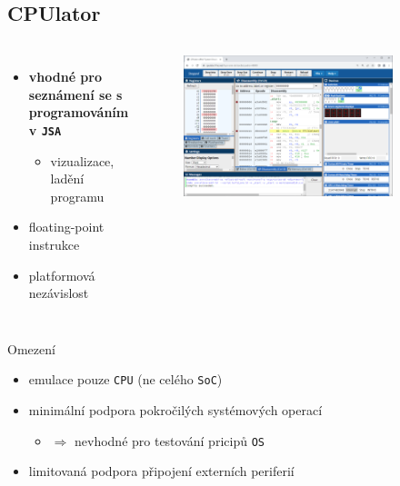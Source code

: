 \documentclass[compress]{beamer}
\begin{document}
\subsection{CPUlator}

\begin{frame}
	\vspace{-0.4cm}
	\begin{columns}
		\begin{itemize}
			\item \textbf{vhodné pro seznámení se s programováním v \texttt{JSA}}
			\begin{itemize}
				\item vizualizace, ladění programu
			\end{itemize}
			\item floating-point instrukce
			\item platformová nezávislost
		\end{itemize}
		\begin{figure}
			\centering
			\includegraphics[width=0.85\textwidth]{img/cpulator.png}
			\caption{\href{https://cpulator.01xz.net}{}}
			\label{CPUlator}
		\end{figure}
	\end{columns}
	\noindent\makebox[\linewidth]{\rule{\textwidth}{0.4pt}}
	\begin{block}{Omezení}
		\begin{itemize}
			\item emulace pouze \texttt{CPU} (ne celého \texttt{SoC})
			\item minimální podpora pokročilých systémových operací
			\begin{itemize}
				\item $\Rightarrow$ nevhodné pro testování pricipů \texttt{OS}
			\end{itemize}
			\item limitovaná podpora připojení externích periferií
		\end{itemize}
	\end{block}
\end{frame}
\end{document}
